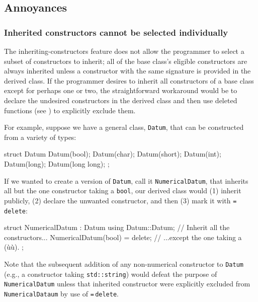 \subsection[Annoyances]{Annoyances}\label{annoyances-inheritingctor}

\subsubsection[Inherited constructors cannot be selected individually]{Inherited constructors cannot be selected individually}\label{inherited-constructors-cannot-be-selected-individually}

The inheriting-constructors feature does not allow the programmer
to select a subset of constructors to inherit; all of the base
class's eligible constructors are always inherited unless a constructor
with the same signature is provided in the derived class. If the
programmer desires to inherit all constructors of a base class except
for perhaps one or two, the straightforward workaround would be to
declare the undesired constructors in the derived class and then use
deleted functions (see ) 
to explicitly exclude them.

For example, suppose we have a general class, \lstinline!Datum!, that can
be constructed from a variety of types:

\begin{emcppslisting}[language=C++]
struct Datum
{
    Datum(bool);
    Datum(char);
    Datum(short);
    Datum(int);
    Datum(long);
    Datum(long long);
};
\end{emcppslisting}
    
\noindent If we wanted to create a version of \lstinline!Datum!, call it
\lstinline!NumericalDatum!, that inherits all but the one constructor
taking a \lstinline!bool!, our derived class would (1) inherit publicly, 
(2) declare the unwanted constructor, and then (3) mark it with
\lstinline!=!\,\lstinline!delete!:

\begin{emcppslisting}[language=C++]
struct NumericalDatum : Datum
{
    using Datum::Datum;             // Inherit all the constructors...
    NumericalDatum(bool) = delete;  // ...except the one taking a (ù{}ù).
};
\end{emcppslisting}
    
\noindent Note that the subsequent addition of any non-numerical constructor to
\lstinline!Datum! (e.g., a constructor taking \lstinline!std::string!) would
defeat the purpose of \lstinline!NumericalDatum! unless that inherited constructor were explicitly excluded from \lstinline!NumericalDataum! by use of \lstinline!=!\,\lstinline!delete!.

